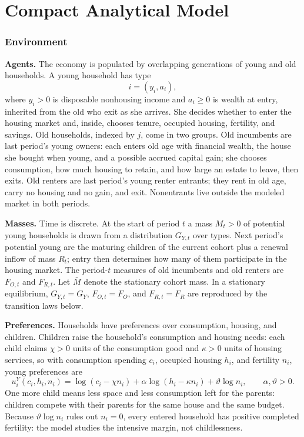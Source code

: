 \documentclass[11pt]{article}
\newcommand{\1}{\mathbf 1}
\begin{document}
\clearpage
\tableofcontents
\clearpage

\part{Compact Analytical Model}

\section{Environment}

\textbf{Agents.} The economy is populated by overlapping generations of young and old households. A young household has type
\[
i=(y_i,a_i),
\]
where $y_i>0$ is disposable nonhousing income and $a_i\ge0$ is wealth at entry, inherited from the old who exit as she arrives. She decides whether to enter the housing market and, inside, chooses tenure, occupied housing, fertility, and savings. Old households, indexed by $j$, come in two groups. Old incumbents are last period's young owners: each enters old age with financial wealth, the house she bought when young, and a possible accrued capital gain; she chooses consumption, how much housing to retain, and how large an estate to leave, then exits. Old renters are last period's young renter entrants; they rent in old age, carry no housing and no gain, and exit. Nonentrants live outside the modeled market in both periods.

\textbf{Masses.} Time is discrete. At the start of period $t$ a mass $M_t>0$ of potential young households is drawn from a distribution $G_{Y,t}$ over types. Next period's potential young are the maturing children of the current cohort plus a renewal inflow of mass $R_t$; entry then determines how many of them participate in the housing market. The period-$t$ measures of old incumbents and old renters are $F_{O,t}$ and $F_{R,t}$. Let $\bar M$ denote the stationary cohort mass. In a stationary equilibrium, $G_{Y,t}=G_Y$, $F_{O,t}=F_O$, and $F_{R,t}=F_R$ are reproduced by the transition laws below.

\textbf{Preferences.} Households have preferences over consumption, housing, and children. Children raise the household's consumption and housing needs: each child claims $\chi>0$ units of the consumption good and $\kappa>0$ units of housing services, so with consumption spending $c_i$, occupied housing $h_i$, and fertility $n_i$, young preferences are
\[
u_i^Y(c_i,h_i,n_i)=
\log(c_i-\chi n_i)+\alpha\log(h_i-\kappa n_i)+\vartheta\log n_i,
\qquad \alpha,\vartheta>0.
\]
One more child means less space and less consumption left for the parents: children compete with their parents for the same house and the same budget. Because $\vartheta\log n_i$ rules out $n_i=0$, every entered household has positive completed fertility: the model studies the intensive margin, not childlessness.
\end{document}
